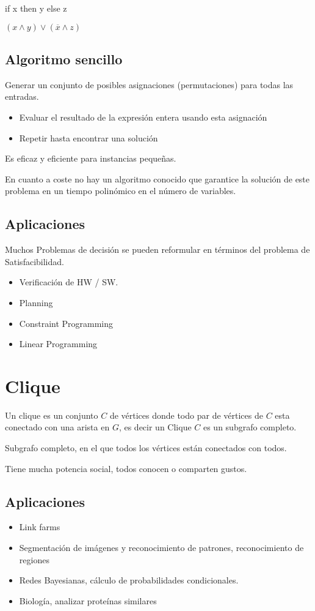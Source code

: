 if x then y else z

$(x \wedge y) \vee (\overline{x} \wedge z)$
\pagebreak

\subsection{Algoritmo sencillo}
Generar un conjunto de posibles asignaciones (permutaciones) para todas las entradas.
\begin{itemize}
    \item Evaluar el resultado de la expresión entera usando esta asignación
    \item Repetir hasta encontrar una solución
\end{itemize}
Es eficaz y eficiente para instancias pequeñas.

En cuanto a coste no hay un algoritmo conocido que garantice la solución de este problema en un tiempo polinómico en el número de variables.

\subsection{Aplicaciones}
Muchos Problemas de decisión se pueden reformular en términos del problema de Satisfacibilidad.
\begin{itemize}
    \item Verificación de HW / SW.
    \item Planning
    \item Constraint Programming
    \item Linear Programming
\end{itemize}

\section{Clique}
Un clique es un conjunto $C$ de vértices donde todo par de vértices de $C$ esta conectado con una arista en $G$, es decir un Clique $C$ es un subgrafo completo.

Subgrafo completo, en el que todos los vértices están conectados con todos.

Tiene mucha potencia social, todos conocen o comparten gustos.

\subsection{Aplicaciones}
\begin{itemize}
    \item Link farms
    \item Segmentación de imágenes y reconocimiento de patrones, reconocimiento de regiones
    \item Redes Bayesianas, cálculo de probabilidades condicionales.
    \item Biología, analizar proteínas similares
\end{itemize}

